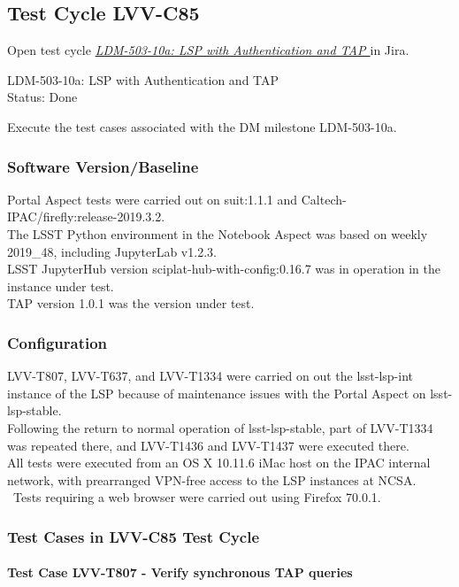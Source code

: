 \documentclass[DM,STR,toc]{lsstdoc}
\begin{document}
\subsection{Test Cycle LVV-C85 }

Open test cycle {\it \href{https://jira.lsstcorp.org/secure/Tests.jspa#/testrun/LVV-C85}{LDM-503-10a: LSP with Authentication and TAP
}} in Jira.

LDM-503-10a: LSP with Authentication and TAP
\\
Status: Done

Execute the test cases associated with the DM milestone LDM-503-10a.


\subsubsection{Software Version/Baseline}
Portal Aspect tests were carried out on suit:1.1.1 and
Caltech-IPAC/firefly:release-2019.3.2.\\
The LSST Python environment in the Notebook Aspect was based on weekly
2019\_48, including JupyterLab v1.2.3.\\
LSST JupyterHub version sciplat-hub-with-config:0.16.7 was in operation
in the instance under test.\\
TAP version 1.0.1 was the version under test.


\subsubsection{Configuration}
LVV-T807, LVV-T637, and LVV-T1334 were carried on out the lsst-lsp-int
instance of the LSP because of maintenance issues with the Portal Aspect
on lsst-lsp-stable.\\
Following the return to normal operation of lsst-lsp-stable, part of
LVV-T1334 was repeated there, and LVV-T1436 and LVV-T1437 were executed
there.\\[2\baselineskip]All tests were executed from an OS X 10.11.6
iMac host on the IPAC internal network, with prearranged VPN-free access
to the LSP instances at NCSA. ~Tests requiring a web browser were
carried out using Firefox 70.0.1.


\subsubsection{Test Cases in LVV-C85 Test Cycle}

\paragraph{Test Case LVV-T807 - Verify synchronous TAP queries
 }\mbox{}\\
\end{document}
